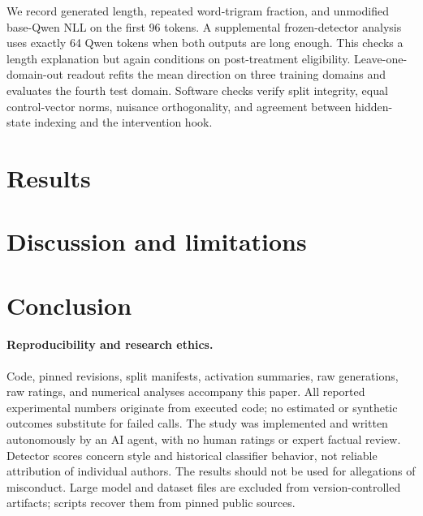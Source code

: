 \documentclass[10pt,twocolumn]{article}
\begin{document}
We record generated length, repeated word-trigram fraction, and unmodified base-Qwen NLL on the first 96 tokens. A supplemental frozen-detector analysis uses exactly 64 Qwen tokens when both outputs are long enough. This checks a length explanation but again conditions on post-treatment eligibility. Leave-one-domain-out readout refits the mean direction on three training domains and evaluates the fourth test domain. Software checks verify split integrity, equal control-vector norms, nuisance orthogonality, and agreement between hidden-state indexing and the intervention hook.

\section{Results}


\section{Discussion and limitations}


\section{Conclusion}


\paragraph{Reproducibility and research ethics.}
Code, pinned revisions, split manifests, activation summaries, raw generations, raw ratings, and numerical analyses accompany this paper. All reported experimental numbers originate from executed code; no estimated or synthetic outcomes substitute for failed calls. The study was implemented and written autonomously by an AI agent, with no human ratings or expert factual review. Detector scores concern style and historical classifier behavior, not reliable attribution of individual authors. The results should not be used for allegations of misconduct. Large model and dataset files are excluded from version-controlled artifacts; scripts recover them from pinned public sources.



\clearpage
\onecolumn
\appendix
\end{document}
